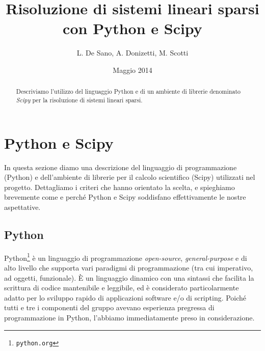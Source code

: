\documentclass[11pt,a4paper]{scrartcl}
\author{L. De Sano, A. Donizetti, M. Scotti}
\title{Risoluzione di sistemi lineari sparsi\\con Python e Scipy}
\date{Maggio 2014}
\begin{document}
\maketitle
\begin{abstract}
Descriviamo l'utilizzo del linguaggio Python e di un ambiente di librerie denominato \emph{Scipy} per la risoluzione di sistemi lineari sparsi.
\end{abstract}

\section*{Python e Scipy}

In questa sezione diamo una descrizione del linguaggio di programmazione (Python) e dell'ambiente di librerie per il calcolo scientifico (Scipy) utilizzati nel progetto. Dettagliamo i criteri che hanno orientato la scelta, e spieghiamo brevemente come e perché Python e Scipy soddisfano effettivamente le nostre aspettative.

\subsection*{Python}

Python\footnote{\texttt{python.org}} è un linguaggio di programmazione \emph{open-source}, \emph{general-purpose} e di alto livello che supporta vari paradigmi di programmazione (tra cui imperativo, ad oggetti, funzionale). È un linguaggio dinamico con una sintassi che facilita la scrittura di codice mantenibile e leggibile, ed è considerato particolarmente adatto per lo sviluppo rapido di applicazioni software e/o di scripting. Poiché tutti e tre i componenti del gruppo avevano esperienza pregressa di programmazione in Python, l'abbiamo immediatamente preso in considerazione.
\end{document}
